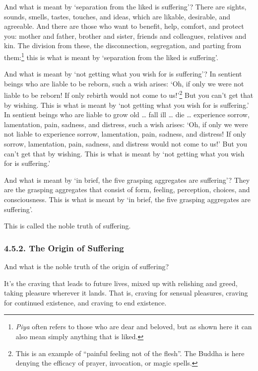 \documentclass[12pt,openany]{book}%
\begin{document}
And what is meant by ‘separation from the liked is suffering’? There are sights, sounds, smells, tastes, touches, and ideas, which are likable, desirable, and agreeable. And there are those who want to benefit, help, comfort, and protect you: mother and father, brother and sister, friends and colleagues, relatives and kin. The division from these, the disconnection, segregation, and parting from them:\footnote{\textit{Piya} often refers to those who are dear and beloved, but as shown here it can also mean simply anything that is liked. } this is what is meant by ‘separation from the liked is suffering’. 

And what is meant by ‘not getting what you wish for is suffering’? In sentient beings who are liable to be reborn, such a wish arises: ‘Oh, if only we were not liable to be reborn! If only rebirth would not come to us!’\footnote{This is an example of “painful feeling not of the flesh”. The Buddha is here denying the efficacy of prayer, invocation, or magic spells. } But you can’t get that by wishing. This is what is meant by ‘not getting what you wish for is suffering.’ In sentient beings who are liable to grow old … fall ill … die … experience sorrow, lamentation, pain, sadness, and distress, such a wish arises: ‘Oh, if only we were not liable to experience sorrow, lamentation, pain, sadness, and distress! If only sorrow, lamentation, pain, sadness, and distress would not come to us!’ But you can’t get that by wishing. This is what is meant by ‘not getting what you wish for is suffering.’ 

And what is meant by ‘in brief, the five grasping aggregates are suffering’? They are the grasping aggregates that consist of form, feeling, perception, choices, and consciousness. This is what is meant by ‘in brief, the five grasping aggregates are suffering’. 

This is called the noble truth of suffering. 

\subsubsection*{4.5.2. The Origin of Suffering }

And what is the noble truth of the origin of suffering? 

It’s the craving that leads to future lives, mixed up with relishing and greed, taking pleasure wherever it lands. That is, craving for sensual pleasures, craving for continued existence, and craving to end existence. 
\end{document}
